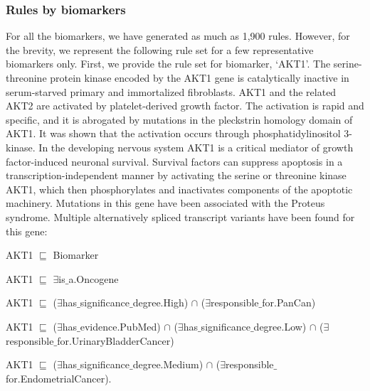 \subsubsection{Rules by biomarkers}
For all the biomarkers, we have generated as much as 1,900 rules. However, for the brevity, we represent the following rule set for a few representative biomarkers only. First, we provide the rule set for biomarker, `AKT1'. The serine-threonine protein kinase encoded by the AKT1 gene is catalytically inactive in serum-starved primary and immortalized fibroblasts. AKT1 and the related AKT2 are activated by platelet-derived growth factor. The activation is rapid and specific, and it is abrogated by mutations in the pleckstrin homology domain of AKT1. It was shown that the activation occurs through phosphatidylinositol 3-kinase. In the developing nervous system AKT1 is a critical mediator of growth factor-induced neuronal survival. Survival factors can suppress apoptosis in a transcription-independent manner by activating the serine or threonine kinase AKT1, which then phosphorylates and inactivates components of the apoptotic machinery. Mutations in this gene have been associated with the Proteus syndrome. Multiple alternatively spliced transcript variants have been found for this gene: 

\begin{itemize}[noitemsep]
\scriptsize{
    \item AKT1 $ \sqsubseteq  $ Biomarker
    \item AKT1 $ \sqsubseteq  $ $\exists$is$ {\_}$a.Oncogene
    \item AKT1 $ \sqsubseteq  $ ($\exists$has$ {\_}$significance$ {\_}$degree.High) $  \cap $ ($\exists$responsible$ {\_}$for.PanCan)
    \item AKT1 $ \sqsubseteq  $ ($\exists$has$ {\_}$evidence.PubMed) $  \cap $ ($\exists$has$ {\_}$significance$ {\_}$degree.Low) $  \cap $ ($\exists$responsible$ {\_}$for.UrinaryBladderCancer)
    \item AKT1 $ \sqsubseteq  $ ($\exists$has$ {\_}$significance$ {\_}$degree.Medium) $  \cap $ ($\exists$responsible$ {\_}$for.EndometrialCancer).}
\end{itemize}

